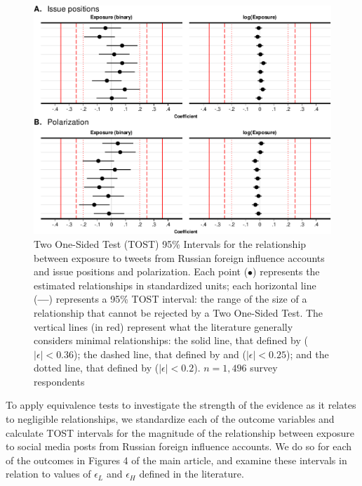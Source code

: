 \documentclass[
  12pt,
]{article}
\begin{document}
\begin{figure}
\centering
\includegraphics{Supplementary_Information_files/figure-latex/Supplementary-Figure-B3-1.pdf}
\caption{\label{fig:Supplementary-Figure-B3}Two One-Sided Test (TOST) 95\% Intervals for the relationship between exposure to tweets from Russian foreign influence accounts and issue positions and polarization. Each point (\(\bullet\)) represents the estimated relationships in standardized units; each horizontal line (\textbf{---}) represents a 95\% TOST interval: the range of the size of a relationship that cannot be rejected by a Two One-Sided Test. The vertical lines (in red) represent what the literature generally considers minimal relationships: the solid line, that defined by \citet{Hartman2018} (\(|\epsilon| < 0.36\)); the dashed line, that defined by \citet{Ho2007} and \citet{Imbens2015} (\(|\epsilon| < 0.25\)); and the dotted line, that defined by \citet{Cohen1969} (\(|\epsilon| < 0.2\)). \(n = 1,496\) survey respondents}
\end{figure}

To apply equivalence tests to investigate the strength of the evidence as it relates to negligible relationships, we standardize each of the outcome variables and calculate TOST intervals for the magnitude of the relationship between exposure to social media posts from Russian foreign influence accounts. We do so for each of the outcomes in Figures 4 of the main article, and examine these intervals in relation to values of \(\epsilon_L\) and \(\epsilon_H\) defined in the literature.
\end{document}
